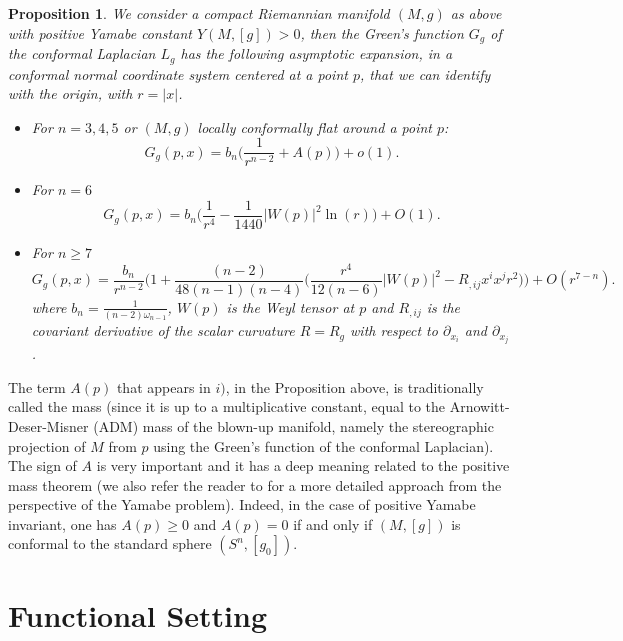 \documentclass[11pt]{article}
\newtheorem{proposition}{Proposition}[section]
\begin{document}
{\begin{proposition}\label{propgreen}
We consider a compact Riemannian manifold $(M,g)$ as above with positive Yamabe constant $Y(M,[g])>0$, then the Green's function $G_{g}$ of the conformal Laplacian $L_{g}$ has the following asymptotic expansion, in a conformal normal coordinate system centered at a point $p$, that we can identify with the origin, with $r=|x|$.
\begin{itemize}
\item[i)] For $n=3,4,5$ or $(M,g)$ locally conformally flat around a point $p$: %
$$G_{g}(p,x)=b_{n}\Big(\frac{1}{r^{n-2}}+A(p)\Big)+o(1).$$
\item[ii)] For $n=6$
$$G_{g}(p,x)=b_{n}\Big(\frac{1}{r^{4}}-\frac{1}{1440}|W(p)|^{2}\ln(r)\Big)+O(1).$$
\item[iii)] For $n\geq 7$
$$G_{g}(p,x)=\frac{b_{n}}{r^{n-2}}\Big(1+\frac{(n-2)}{48(n-1)(n-4)}\Big(\frac{r^{4}}{12(n-6)}|W(p)|^{2}-R_{,ij}x^{i}x^{j}r^{2}\Big)\Big)+O(r^{7-n}).$$
where $b_{n}=\frac{1}{(n-2)\omega_{n-1}}$, $W(p)$ is the Weyl tensor at $p$ and $R_{,ij}$ is the covariant derivative of the scalar curvature $R=R_g$ with respect to $\partial_{x_{i}}$ and $\partial_{x_{j}}$.
\end{itemize}
\end{proposition}


\noindent
The term $A(p)$ that appears in $i)$, in the Proposition above, is traditionally called the mass (since it is up to a multiplicative constant, equal to the Arnowitt-Deser-Misner (ADM) mass of the blown-up manifold, namely the stereographic projection of $M$ from $p$ using the Green's function of the conformal Laplacian). The sign of $A$ is very important and it has a deep meaning related to the positive mass theorem \cite{S,W} (we also refer the reader to \cite{LP} for a more detailed approach from the perspective of the Yamabe problem). Indeed, in the case of positive Yamabe invariant, one has $A(p)\geq 0$ and $A(p)=0$ if and only if $(M,[g])$ is conformal to the standard sphere $(S^{n},[g_{0}])$.

\section{Functional Setting}

}
\end{document}
